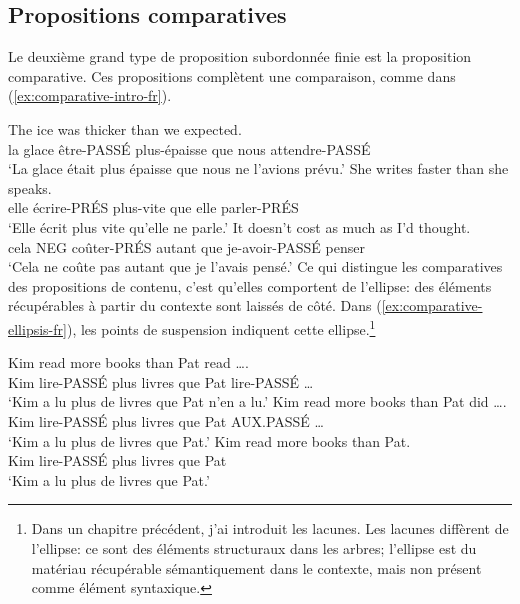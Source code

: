 \subsection{Propositions comparatives}

Le deuxième grand type de proposition subordonnée finie est la proposition comparative. Ces propositions complètent une comparaison, comme dans (\ref{ex:comparative-intro-fr}).

\ea \label{ex:comparative-intro-fr}
    \ea \gll The ice was thicker than {\ob}we expected{\cb}.\\
        la glace être-PASSÉ plus-épaisse que nous attendre-PASSÉ\\
    \glt `La glace était plus épaisse que nous ne l'avions prévu.'
    \ex \gll She writes faster than {\ob}she speaks{\cb}.\\
        elle écrire-PRÉS plus-vite que elle parler-PRÉS\\
    \glt `Elle écrit plus vite qu'elle ne parle.'
    \ex \gll It doesn't cost as much as {\ob}I'd thought{\cb}.\\
        cela NEG coûter-PRÉS autant que je-avoir-PASSÉ penser\\
    \glt `Cela ne coûte pas autant que je l'avais pensé.'
    \z
\z
Ce qui distingue les comparatives des propositions de contenu, c'est qu'elles comportent de l'ellipse: des éléments récupérables à partir du contexte sont laissés de côté. Dans (\ref{ex:comparative-ellipsis-fr}), les points de suspension indiquent cette ellipse.\footnote{Dans un chapitre précédent, j'ai introduit les lacunes. Les lacunes diffèrent de l'ellipse: ce sont des éléments structuraux dans les arbres; l'ellipse est du matériau récupérable sémantiquement dans le contexte, mais non présent comme élément syntaxique.}

\ea \label{ex:comparative-ellipsis-fr}
    \ea \gll Kim read more books than {\ob}Pat read \dots{\cb}.\\
        Kim lire-PASSÉ plus livres que Pat lire-PASSÉ \dots\\
    \glt `Kim a lu plus de livres que Pat n'en a lu.'
    \ex \gll Kim read more books than {\ob}Pat did \dots{\cb}.\\
        Kim lire-PASSÉ plus livres que Pat AUX.PASSÉ \dots\\
    \glt `Kim a lu plus de livres que Pat.'
    \ex \gll Kim read more books than {\ob}Pat{\cb}.\\
        Kim lire-PASSÉ plus livres que Pat\\
    \glt `Kim a lu plus de livres que Pat.'
    \z
\z

